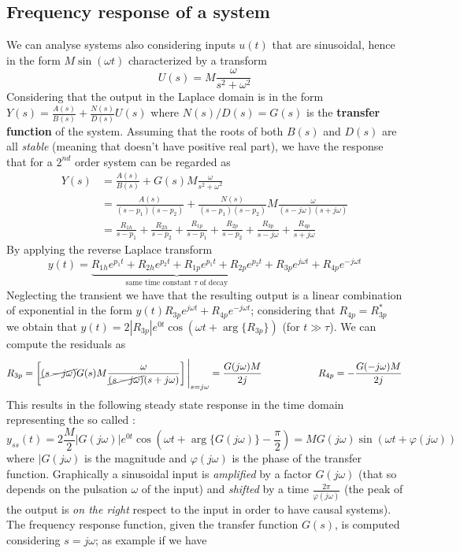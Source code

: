 	\subsection{Frequency response of a system}
		We can analyse systems also considering inputs $u(t)$ that are sinusoidal, hence in the form $M  \sin (\omega t)$ characterized by a transform
		\[ U(s) = M \frac{\omega}{s^2+ \omega^2} \]
		Considering that the output in the Laplace domain is in the form $Y(s) = \frac{A(s)}{B(s)} + \frac{N(s)}{D(s)} U(s)$ where $N(s)/D(s)= G(s)$ is the \textbf{transfer function} of the system. Assuming that the roots of both $B(s)$ and $D(s)$ are all \textit{stable} (meaning that doesn't have positive real part), we have the response that for a $2^{nd}$ order system can be regarded as
		\begin{align*}
			 Y(s) & = \frac{A(s)}{B(s)} +G(s) M \frac{\omega}{s^2 + \omega^2} \\ &   = \frac{A(s)}{(s-p_1)(s-p_2)} + \frac{N(s)}{(s-p_1)(s-p_2)} M \frac{\omega}{(s-j\omega)(s+j\omega)} \\ 
			 & = \frac{R_{1h}}{s - p_1} + \frac{R_{2h}}{s-p_2} + \frac{R_{1p}}{s - p_1} + \frac{R_{2p}}{s-p_2} + \frac{R_{3p}}{s-j\omega} + \frac{R_{4p}}{s+j\omega}
		\end{align*}
		By applying the reverse Laplace transform
		\[ y(t) = \underbrace{R_{1h} e^{p_1t} + R_{2h} e^{p_2t} + R_{1p} e^{p_1t} + R_{2p} e^{p_2t}}_\textrm{same time constant $\tau$ of decay} + R_{3p} e^{j\omega t} + R_{4p} e^{-j\omega t} \]
		Neglecting the transient we have that the resulting output is a linear combination of exponential in the form $ y(t) R_{3p} e^{j\omega t} + R_{4p} e^{-j\omega t}$; considering that $R_{4p} = R_{3p}^*$ we obtain that $y(t) = 2 |R_{3p}| e^{0 t} \cos(\omega t + \arg\{ R_{3p} \})$ (for $t\gg \tau$). We can compute the residuals as
		\[ R_{3p} = \left[ \cancel{(s-j\omega)} G(s) M \frac {\omega}{\cancel{(s-j\omega)}(s+j\omega)}  \right] \Bigg|_{s=j\omega} = \frac{G(j\omega) M}{2j} \hspace{2cm} R_{4p} = - \frac{G(-j\omega) M}{2j}  \]		
		This results in the following steady state response in the time domain representing the so called :
		\begin{equation}
			y_{ss}(t) = 2 \frac M 2 |G(j\omega)| e^{0t} \cos\left( \omega t + \arg\{ G(j\omega) \} - \frac \pi 2\right) = M G(j\omega) \sin(\omega t + \varphi(j\omega))
		\end{equation}
		where $|G(j\omega)$ is the magnitude and $\varphi(j\omega)$ is the phase of the transfer function. Graphically a sinusoidal input is \textit{amplified} by a factor $G(j\omega)$ (that so depends on the pulsation $\omega$ of the input) and \textit{shifted} by a time $\frac{2\pi}{\varphi(j\omega)}$ (the peak of the output is \textit{on the right} respect to the input in order to have causal systems). The frequency response function, given the transfer function $G(s)$, is computed considering $s=j\omega$; as example if we have
